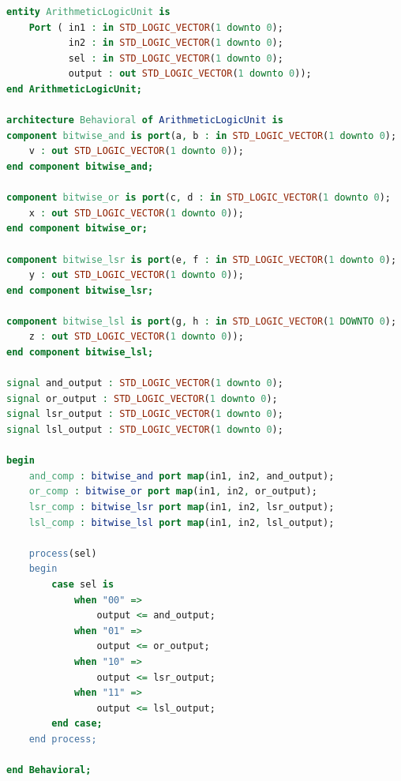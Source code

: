 \documentclass[11pt]{article}
\begin{document}
\begin{appendices}
\begin{lstlisting}[language=VHDL]
entity ArithmeticLogicUnit is
    Port ( in1 : in STD_LOGIC_VECTOR(1 downto 0);
           in2 : in STD_LOGIC_VECTOR(1 downto 0);
           sel : in STD_LOGIC_VECTOR(1 downto 0);
           output : out STD_LOGIC_VECTOR(1 downto 0));
end ArithmeticLogicUnit;

architecture Behavioral of ArithmeticLogicUnit is
component bitwise_and is port(a, b : in STD_LOGIC_VECTOR(1 downto 0); 
	v : out STD_LOGIC_VECTOR(1 downto 0));
end component bitwise_and;

component bitwise_or is port(c, d : in STD_LOGIC_VECTOR(1 downto 0); 
	x : out STD_LOGIC_VECTOR(1 downto 0));
end component bitwise_or;

component bitwise_lsr is port(e, f : in STD_LOGIC_VECTOR(1 downto 0); 
	y : out STD_LOGIC_VECTOR(1 downto 0));
end component bitwise_lsr;

component bitwise_lsl is port(g, h : in STD_LOGIC_VECTOR(1 DOWNTO 0); 
	z : out STD_LOGIC_VECTOR(1 downto 0));
end component bitwise_lsl;

signal and_output : STD_LOGIC_VECTOR(1 downto 0);
signal or_output : STD_LOGIC_VECTOR(1 downto 0);
signal lsr_output : STD_LOGIC_VECTOR(1 downto 0);
signal lsl_output : STD_LOGIC_VECTOR(1 downto 0);

begin
    and_comp : bitwise_and port map(in1, in2, and_output);
    or_comp : bitwise_or port map(in1, in2, or_output);
    lsr_comp : bitwise_lsr port map(in1, in2, lsr_output);
    lsl_comp : bitwise_lsl port map(in1, in2, lsl_output);
    
    process(sel)
    begin
        case sel is
            when "00" =>
                output <= and_output;
            when "01" =>
                output <= or_output;
            when "10" =>
                output <= lsr_output;
            when "11" =>
                output <= lsl_output;
        end case;
    end process;                

end Behavioral;
\end{lstlisting}


\end{appendices}
\end{document}
